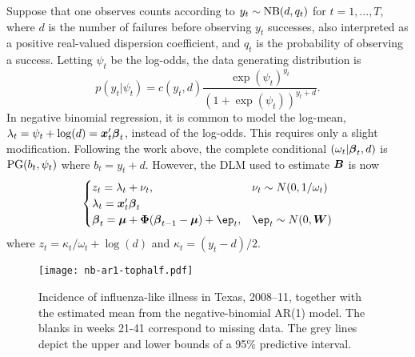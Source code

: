 \begin{example}
  Suppose that one observes counts according to $y_t \sim \text{NB}(d, q_t)$ for
  $t=1, \ldots, T$, where $d$ is the number of failures before observing $y_t$
  successes, also interpreted as a positive real-valued dispersion coefficient,
  and $q_t$ is the probability of observing a success.  Letting $\psi_t$ be the
  log-odds, the data generating distribution is
  \[
  p(y_t | \psi_t) = c(y_t, d) \frac{\exp({\psi_t})^{y_t}}{(1+\exp({\psi_t}))^{y_t+d}}.
  \]
  In negative binomial regression, it is common to model the log-mean, $\lambda_t
  = \psi_t + \log(d) = \boldsymbol{x}_t' \boldsymbol{\beta}_t$, instead of the log-odds.  This requires only
  a slight modification.  Following the work above, the complete conditional
  $(\omega_t | \boldsymbol{\beta}_t, d)$ is $\text{PG}(b_t, \psi_t)$ where $b_t = y_t + d$.  However,
  the DLM used to estimate ${\boldsymbol{B}}$ is now
  \[
  \begin{cases}
    z_t = \lambda_t + \nu_t, & \nu_t \sim N(0, 1/\omega_t) \\
    \lambda_t = \vx_t' \bbeta_t \\
    \bbeta_t = \bmu + \bPhi (\bbeta_{t-1} - \bmu) + \vep_t, & \vep_t \sim N(0, \bW)
  \end{cases}
  \]
  where $z_t = \kappa_t / \omega_t + \log(d)$ and $\kappa_t = (y_t - d) / 2$.
\end{example}



\begin{figure}
  \begin{center}
    \texttt{[image: nb-ar1-tophalf.pdf]}
    \caption{\label{fig:nb-ar1} Incidence of influenza-like illness in Texas,
      2008--11, together with the estimated mean from the negative-binomial AR(1)
      model.  The blanks in weeks 21-41 correspond to missing data.  The grey lines
      depict the upper and lower bounds of a 95$\%$ predictive interval.}
  \end{center}
\end{figure}

